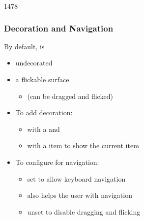\begin{slide}{1478}\frametitle{Decoration and Navigation}


By default,  is
\begin{itemize}
\item undecorated
\item a flickable surface
  \begin{itemize}
  \item (can be dragged and flicked)
  \end{itemize}
\end{itemize}

\vspace*{0.75em}
\begin{itemize}
\item To add decoration:
  \begin{itemize}
  \item with a  and 
  \item with a  item to show the current item
  \end{itemize}

\vspace*{0.75em}
\item To configure for navigation:
  \begin{itemize}
  \item set  to allow keyboard navigation
  \item {} also helps the user with navigation
  \item unset  to disable dragging and flicking
  \end{itemize}
\end{itemize}

\vspace*{0.5em}

\end{slide}


